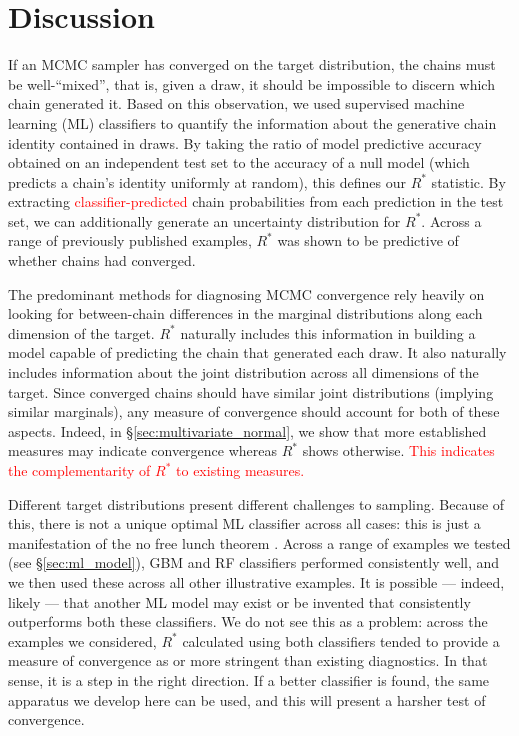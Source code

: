 \documentclass{article}
\begin{document}
\section{Discussion}
If an MCMC sampler has converged on the target distribution, the chains must be well-``mixed'', that is, given a draw, it should be impossible to discern which chain generated it. Based on this observation, we used supervised machine learning (ML) classifiers to quantify the information about the generative chain identity contained in draws. By taking the ratio of model predictive accuracy obtained on an independent test set to the accuracy of a null model (which predicts a chain's identity uniformly at random), this defines our $R^*$ statistic. By extracting \textcolor{red}{classifier-predicted} chain probabilities from each prediction in the test set, we can additionally generate an uncertainty distribution for $R^*$. Across a range of previously published examples, $R^*$ was shown to be predictive of whether chains had converged.

The predominant methods for diagnosing MCMC convergence rely heavily on looking for between-chain differences in the marginal distributions along each dimension of the target. $R^*$ naturally includes this information in building a model capable of predicting the chain that generated each draw. It also naturally includes information about the joint distribution across all dimensions of the target. Since converged chains should have similar joint distributions (implying similar marginals), any measure of convergence should account for both of these aspects. Indeed, in \S\ref{sec:multivariate_normal}, we show that more established measures may indicate convergence whereas $R^*$ shows otherwise. \textcolor{red}{This indicates the complementarity of $R^*$ to existing measures.}

\color{red}
Different target distributions present different challenges to sampling. Because of this, there is not a unique optimal ML classifier across all cases: this is just a manifestation of the no free lunch theorem \citep{wolpert1997no}. Across a range of examples we tested (see \S\ref{sec:ml_model}), GBM and RF classifiers performed consistently well, and we then used these across all other illustrative examples. It is possible — indeed, likely — that another ML model may exist or be invented that consistently outperforms both these classifiers. We do not see this as a problem: across the examples we considered, $R^*$ calculated using both classifiers tended to provide a measure of convergence as or more stringent than existing diagnostics. In that sense, it is a step in the right direction. If a better classifier is found, the same apparatus we develop here can be used, and this will present a harsher test of convergence.
\end{document}
